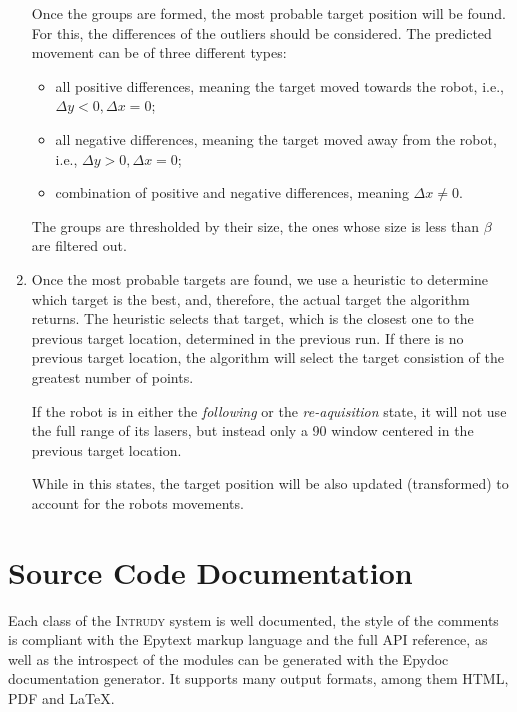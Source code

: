 \documentclass[12pt,a4paper]{scrartcl}
\newcommand{\intrudy}{\textsc{Intrudy}\xspace}
\newcommand{\degrees}{\textdegree\xspace}
\begin{document}
\begin{enumerate}
	Once the groups are formed, the most probable target position will be found. For this, the differences of the outliers should be considered. The predicted movement can be of three different types:
	\begin{itemize}
	\item all positive differences, meaning the target moved towards the robot, i.e., $\Delta y < 0, \Delta x = 0$;
	\item all negative differences, meaning the target moved away from the robot, i.e., $\Delta y > 0, \Delta x = 0$;
	\item combination of positive and negative differences, meaning $\Delta x \neq 0$.
	\end{itemize}
	The groups are thresholded by their size, the ones whose size is less than $\beta$ are filtered out.

	\item Once the most probable targets are found, we use a heuristic to determine which target is the best, and, therefore, the actual target the algorithm returns. 
	The heuristic selects that target, which is the closest one to the previous target location, determined in the previous run. If there is no previous target location, the algorithm will select the target consistion of the greatest number of points.

	If the robot is in either the \textit{following} or the \textit{re-aquisition} state, it will not use the full range of its lasers, but instead only a 90\degrees window centered in the previous target location. 

	While in this states, the target position will be also updated (transformed) to account for the robots movements.
\end{enumerate}



\newpage

\section{Source Code Documentation} %
\label{sec:source_code_documentation}

Each class of the \intrudy system is well documented, the style of the comments is compliant with the Epytext markup language and the full API reference, as well as the introspect of the modules can be generated with the Epydoc documentation generator. It supports many output formats, among them HTML, PDF and \LaTeX.
\end{document}
